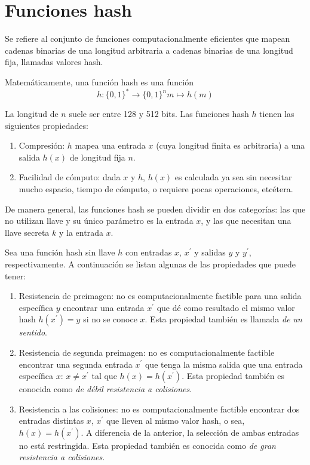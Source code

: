 %
%
\newpage
\section{Funciones hash}

Se refiere al conjunto de funciones computacionalmente eficientes que
mapean cadenas binarias de una longitud arbitraria a cadenas binarias
de una longitud fija, llamadas valores hash.

Matemáticamente, una función hash es una función
\begin{equation}
  \label{funcion_hash_def}
 	h: \{0, 1\}^* \longrightarrow \{0,1\}^n 
 	m \longmapsto h(m)
\end{equation}

La longitud de $n$ suele ser entre 128 y 512 bits. Las funciones hash 
$h$ tienen las siguientes propiedades:
\begin{enumerate}
	\item Compresión: $h$ mapea una entrada $x$ (cuya longitud
		finita es arbitraria) a una salida $h(x)$ de longitud fija $n$.
	\item Facilidad de cómputo: dada $x$ y $h$, $h(x)$ es 
		calculada ya sea sin necesitar mucho espacio, tiempo de cómputo, o 
		requiere pocas operaciones, etcétera.
\end{enumerate} 

De manera general, las funciones hash se pueden dividir en dos 
categorías: las que no utilizan llave y su único parámetro es la entrada
$x$, y las que necesitan una llave secreta $k$ y la entrada $x$.

Sea una función hash sin llave $h$ con entradas $x$, $x^\prime$ y 
salidas $y$ y $y^\prime$, respectivamente. A continuación se listan
algunas de las propiedades que puede tener:
\begin{enumerate}
	\item Resistencia de preimagen: no es computacionalmente factible
		para una salida específica $y$ encontrar una entrada $x^\prime$ que 
		dé como resultado el mismo valor hash $h(x^\prime) = y$ si no se
		conoce $x$. Esta propiedad también es llamada 
		\textit{de un sentido}.
	\item Resistencia de segunda preimagen: no es computacionalmente
		factible encontrar una segunda entrada $x^\prime$  que tenga la 
		misma salida que una entrada específica $x$: $x \neq x^\prime$
		tal que $h(x) = h(x^\prime)$. Esta propiedad también es conocida 
		como \textit{de débil resistencia a colisiones}.
	\item Resistencia a las colisiones: no es computacionalmente factible 
		encontrar dos entradas distintas $x$, $x^\prime$ que lleven al 
		mismo valor hash, o sea, $h(x) = h(x^\prime)$. A diferencia de la 
		anterior, la selección de ambas entradas no está restringida. Esta
		propiedad también es conocida como 
		\textit{de gran resistencia a colisiones}.
\end{enumerate}

